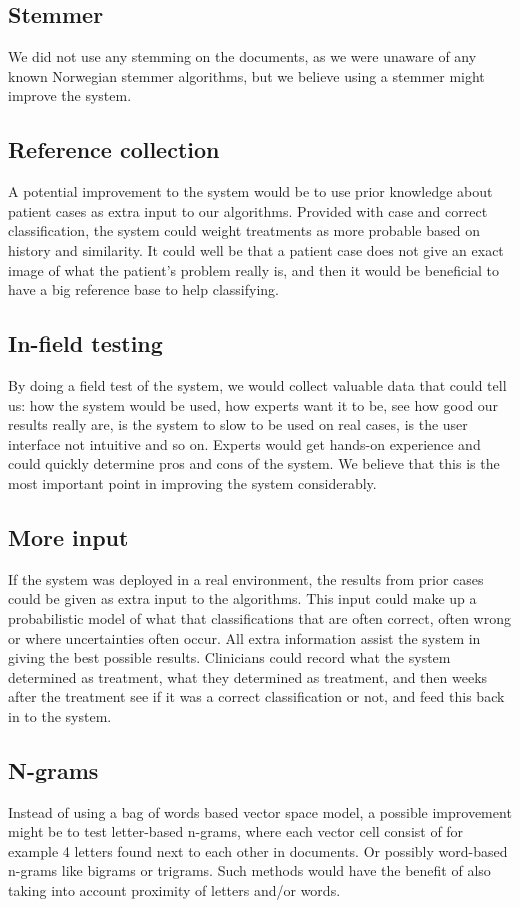 \subsection{Stemmer}
We did not use any stemming on the documents, as we were unaware of any known Norwegian stemmer algorithms, but we believe using a stemmer might improve the system.

\subsection{Reference collection}
A potential improvement to the system would be to use prior knowledge about patient cases as extra input to our algorithms. Provided with case and correct classification, the system could weight treatments as more probable based on history and similarity. It could well be that a patient case does not give an exact image of what the patient's problem really is, and then it would be beneficial to have a big reference base to help classifying. 

\subsection{In-field testing}
By doing a field test of the system, we would collect valuable data that could tell us: how the system would be used, how experts want it to be, see how good our results really are, is the system to slow to be used on real cases, is the user interface not intuitive and so on. Experts would get hands-on experience and could quickly determine pros and cons of the system. We believe that this is the most important point in improving the system considerably.

\subsection{More input}
If the system was deployed in a real environment, the results from prior cases could be given as extra input to the algorithms. This input could make up a probabilistic model of what that classifications that are often correct, often wrong or where uncertainties often occur. All extra information assist the system in giving the best possible results. Clinicians could record what the system determined as treatment, what they determined as treatment, and then weeks after the treatment see if it was a correct classification or not, and feed this back in to the system.

\subsection{N-grams}
Instead of using a bag of words based vector space model, a possible improvement might be to test letter-based n-grams, where each vector cell consist of for example 4 letters found next to each other in documents. Or possibly word-based n-grams like bigrams or trigrams. Such methods would have the benefit of also taking into account proximity of letters and/or words.

